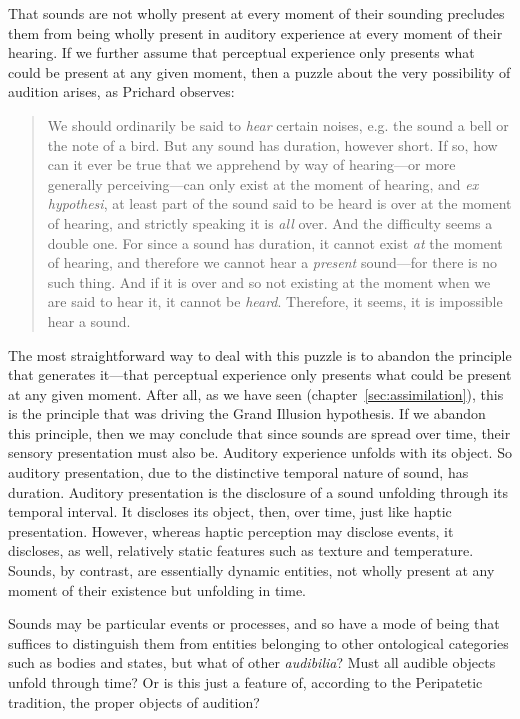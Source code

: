 That sounds are not wholly present at every moment of their sounding precludes them from being wholly present in auditory experience at every moment of their hearing. If we further assume that perceptual experience only presents what could be present at any given moment, then a puzzle about the very possibility of audition arises, as Prichard observes: 
\begin{quote}
	We should ordinarily be said to \emph{hear} certain noises, e.g. the sound a bell or the note of a bird. But any sound has duration, however short. If so, how can it ever be true that we apprehend by way of hearing---or more generally perceiving---can only exist at the moment of hearing, and \emph{ex hypothesi}, at least part of the sound said to be heard is over at the moment of hearing, and strictly speaking it is \emph{all} over. And the difficulty seems a double one. For since a sound has duration, it cannot exist \emph{at} the moment of hearing, and therefore we cannot hear a \emph{present} sound---for there is no such thing. And if it is over and so not existing at the moment when we are said to hear it, it cannot be \emph{heard}. Therefore, it seems, it is impossible hear a sound. \citep[47]{Prichard:1950ly}
\end{quote}
The most straightforward way to deal with this puzzle is to abandon the principle that generates it---that perceptual experience only presents what could be present at any given moment. After all, as we have seen (chapter~\ref{sec:assimilation}), this is the principle that was driving the Grand Illusion hypothesis. If we abandon this principle, then we may conclude that since sounds are spread over time, their sensory presentation must also be. Auditory experience unfolds with its object. So auditory presentation, due to the distinctive temporal nature of sound, has duration. Auditory presentation is the disclosure of a sound unfolding through its temporal interval. It discloses its object, then, over time, just like haptic presentation. However, whereas haptic perception may disclose events, it discloses, as well, relatively static features such as texture and temperature. Sounds, by contrast, are essentially dynamic entities, not wholly present at any moment of their existence but unfolding in time. 

Sounds may be particular events or processes, and so have a mode of being that suffices to distinguish them from entities belonging to other ontological categories such as bodies and states, but what of other \emph{audibilia}? Must all audible objects unfold through time? Or is this just a feature of, according to the Peripatetic tradition, the proper objects of audition? 

